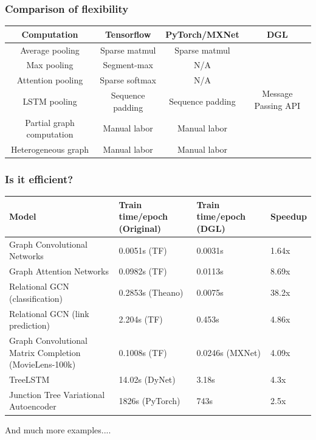 \documentclass[10pt,aspectratio=169]{beamer}
\begin{document}
	\begin{frame}
		\frametitle{Comparison of flexibility}
		\begin{tabular}{|c|ccc|}
			\hline
			Computation & Tensorflow & PyTorch/MXNet & DGL \\
			\hline
			Average pooling & Sparse matmul & Sparse matmul & \multirow{6}{*}{Message Passing API} \\
			Max pooling & Segment-max & N/A & \\
			Attention pooling & Sparse softmax & N/A & \\
			LSTM pooling & Sequence padding & Sequence padding & \\
			Partial graph computation & Manual labor & Manual labor & \\
			Heterogeneous graph & Manual labor & Manual labor & \\
			\hline
		\end{tabular}
	\end{frame}

	\begin{frame}
		\frametitle{Is it efficient?}
		\begin{center}
			\centering
			\begin{tabular}{|p{}p{0.2\textwidth}p{}p{}|}
				\hline
				Model & Train time/epoch (Original) & Train time/epoch (DGL) & Speedup \\
				\hline
				Graph Convolutional Networks & 0.0051s (TF) & 0.0031s & 1.64x \\
				\hline
				Graph Attention Networks & 0.0982s (TF) & 0.0113s & 8.69x \\
				\hline
				Relational GCN (classification) & 0.2853s (Theano) & 0.0075s & 38.2x \\
				\hline
				Relational GCN (link prediction) & 2.204s (TF) & 0.453s & 4.86x \\
				\hline
				Graph Convolutional Matrix Completion (MovieLens-100k) & 0.1008s (TF) & 0.0246s (MXNet) & 4.09x \\
				\hline
				TreeLSTM & 14.02s (DyNet) & 3.18s & 4.3x \\
				\hline
				Junction Tree Variational Autoencoder & 1826s (PyTorch) & 743s & 2.5x \\
				\hline
			\end{tabular}
			And much more examples....
		\end{center}
	\end{frame}
\end{document}
